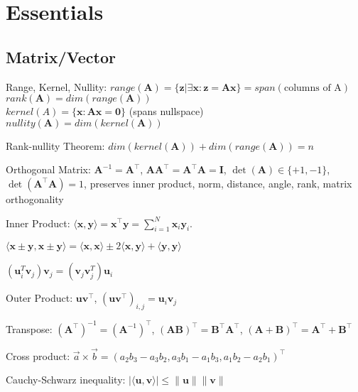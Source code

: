\section{Essentials}
\subsection*{Matrix/Vector}
\begin{compactdesc}
    \item[Range, Kernel, Nullity:]
    $\mathit{range}(\mathbf{A}) = \{\textbf{z} | \exists \textbf{x}: \textbf{z}=\textbf{Ax}\} = \mathit{span}(\text{columns of A})$ \\
    $\mathit{rank}(\mathbf{A}) = \mathit{dim}(\mathit{range}(\mathbf{A}))$ \\
    $\mathit{kernel}(A) = \{\mathbf{x}: \mathbf{Ax}=\mathbf{0}\}$ (spans nullspace)\\
    $\mathit{nullity}(\mathbf{A}) = \mathit{dim}(\mathit{kernel}(\mathbf{A}))$
    \item[Rank-nullity Theorem:]
    $\textit{dim}(\textit{kernel}(\textbf{A}))+\textit{dim}(\textit{range}(\textbf{A})) = n$
	\item[Orthogonal Matrix:] $\mathbf{A}^{-1} = \mathbf{A}^\top$, $\mathbf{A} \mathbf{A}^\top = \mathbf{A}^\top \mathbf{A} = \mathbf{I}$, $\operatorname{det}(\mathbf{A}) \in \{+1, -1\}$, $\operatorname{det}(\mathbf{A}^\top \mathbf{A}) = 1$,
	preserves inner product, norm, distance, angle, rank, matrix orthogonality 
	
	\item[Inner Product:] $\langle \mathbf{x}, \mathbf{y} \rangle = \mathbf{x}^\top \mathbf{y} = \sum_{i=1}^{N} \mathbf{x}_i \mathbf{y}_i$.
	\begin{inparaitem}
		\item $\langle \mathbf{x} \pm \mathbf{y}, \mathbf{x} \pm \mathbf{y} \rangle = \langle \mathbf{x}, \mathbf{x} \rangle \pm 2 \langle \mathbf{x}, \mathbf{y} \rangle + \langle \mathbf{y}, \mathbf{y} \rangle$
		\item $(\mathbf{u}_i^T\mathbf{v}_j)\mathbf{v}_j = (\mathbf{v}_j\mathbf{v}_j^T)\mathbf{u}_i$
	\end{inparaitem}
	\item[Outer Product:] $\mathbf{u} \mathbf{v}^\top$, $(\mathbf{u} \mathbf{v}^\top)_{i, j} = \mathbf{u}_i \mathbf{v}_j$
	\item[Transpose:] $(\mathbf{A}^\top)^{-1} = (\mathbf{A}^{-1})^\top$,  $(\mathbf{A}\mathbf{B})^\top= \mathbf{B}^\top\mathbf{A}^\top$, $(\mathbf{A}+\mathbf{B})^\top= \mathbf{A}^\top + \mathbf{B}^\top$
	\item[Cross product:] $\vec{a}\times\vec{b}=(a_2b_3-a_3b_2, a_3b_1-a_1b_3, a_1b_2-a_2b_1)^\top$
	\item[Cauchy-Schwarz inequality:] $|\langle\mathbf{u}, \mathbf{v}\rangle| \leq \|\mathbf{u}\|\|\mathbf{v}\|$
\end{compactdesc}

